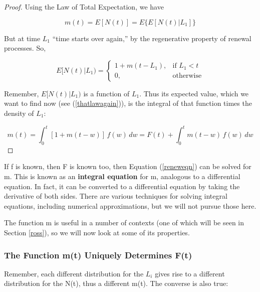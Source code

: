 \begin{proof}


Using the Law of Total Expectation, we have

\begin{equation}
\label{thatlawagain}
m(t)=E[N(t)]=E\{E[N(t)|L_{1}]\}
\end{equation}

But at time $L_{1}$ ``time starts over again,'' by the regenerative
property of renewal processes. So,

\begin{equation}
E[N(t)|L_{1})=\left\{ \begin{array}{rl}
1+m(t-L_{1}), & \textrm{if }L_{1}<t\\
0, & \textrm{otherwise}
\end{array}\right. 
\end{equation}

Remember, $E[N(t)|L_{1})$ is a function of $L_1$.  Thus its expected
value, which we want to find now (see (\ref{thatlawagain})), is the
integral of that function times the density of $L_1$:

\begin{equation}
m(t)=\int _{0}^{t}[1+m(t-w)]\, f(w)\, dw=F(t)+\int _{0}^{t}m(t-w)\, f(w)\, dw
\end{equation}


\end{proof}

If f is known, then F is known too, then  Equation (\ref{reneweqn}) can be
solved for m.  This is known as an \textbf{integral equation} for m,
analogous to a differential equation.  In fact, it can be converted to a
differential equation by taking the derivative of both sides. There are
various techniques for solving integral equations, including numerical
approximations, but we will not pursue those here.

The function m is useful in a number of contexts (one of which will be
seen in Section \ref{ross}), so we will now look at some of its
properties.

\subsubsection{The Function m(t) Uniquely Determines F(t)}

Remember, each different distribution for the $L_i$ gives rise to a
different distribution for the N(t), thus a different m(t).  The
converse is also true:

